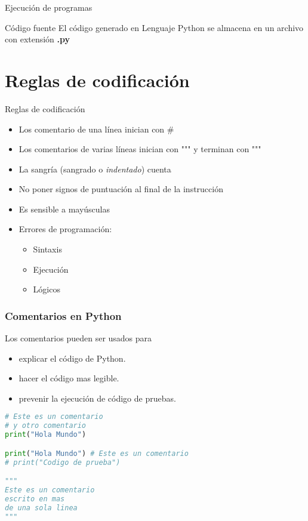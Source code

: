 \begin{frame}[c]{Ejecución de programas}
  \begin{block}{Código fuente}
    El código generado en Lenguaje Python se almacena en un archivo con
    extensión \textbf{.py}
  \end{block}
\end{frame}

\section{Reglas de codificación}

\begin{frame}[c]{Reglas de codificación}
  \begin{itemize}
    \item Los comentario de una línea inician con \textcolor{codeComment}{\#}
    \pausa
    \item Los comentarios de varias líneas inician con
    \textcolor{codeComment}{"""} y terminan con \textcolor{codeComment}{"""}
    \pausa
    \item La sangría (sangrado o \textit{indentado}) cuenta
    \pausa
    \item No poner signos de puntuación al final de la instrucción
    \pausa
    \item Es sensible a mayúsculas
    \pausa
    \item Errores de programación:
          \begin{itemize}
            \item Sintaxis
            \item Ejecución
            \item Lógicos
          \end{itemize}
  \end{itemize}
\end{frame}

\begin{frame}[fragile]
  \frametitle{Comentarios en Python}
  \vspace{\baselineskip}
  Los comentarios pueden ser usados para

  \begin{itemize}
    \item explicar el código de Python.
    \item hacer el código mas legible.
    \item prevenir la ejecución de código de pruebas.
  \end{itemize}

  \begin{lstlisting}[language=Python]
# Este es un comentario
# y otro comentario
print("Hola Mundo")

print("Hola Mundo") # Este es un comentario
# print("Codigo de prueba")

"""
Este es un comentario
escrito en mas
de una sola linea
"""
  \end{lstlisting}
\end{frame}

